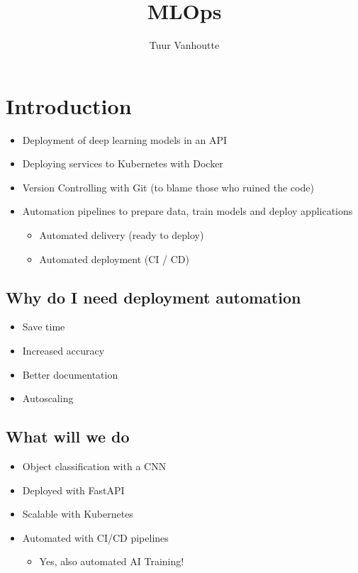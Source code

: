 \documentclass{article}
\begin{document}
\begin{titlepage}
    \author{Tuur Vanhoutte}
    \title{MLOps}
\end{titlepage}

\maketitle
\newpage
\tableofcontents
\newpage


\section{Introduction}

\begin{itemize}
    \item Deployment of deep learning models in an API
    \item Deploying services to Kubernetes with Docker
    \item Version Controlling with Git (to blame those who ruined the code)
    \item Automation pipelines to prepare data, train models and deploy applications
    \begin{itemize}
        \item Automated delivery (ready to deploy)
        \item Automated deployment (CI / CD)
    \end{itemize}
\end{itemize}

\subsection{Why do I need deployment automation}

\begin{itemize}
    \item Save time
    \item Increased accuracy
    \item Better documentation
    \item Autoscaling
\end{itemize}

\subsection{What will we do}

\begin{itemize}
    \item Object classification with a CNN
    \item Deployed with FastAPI 
    \item Scalable with Kubernetes
    \item Automated with CI/CD pipelines
    \begin{itemize}
        \item Yes, also automated AI Training!
    \end{itemize}
\end{itemize}
\end{document}
